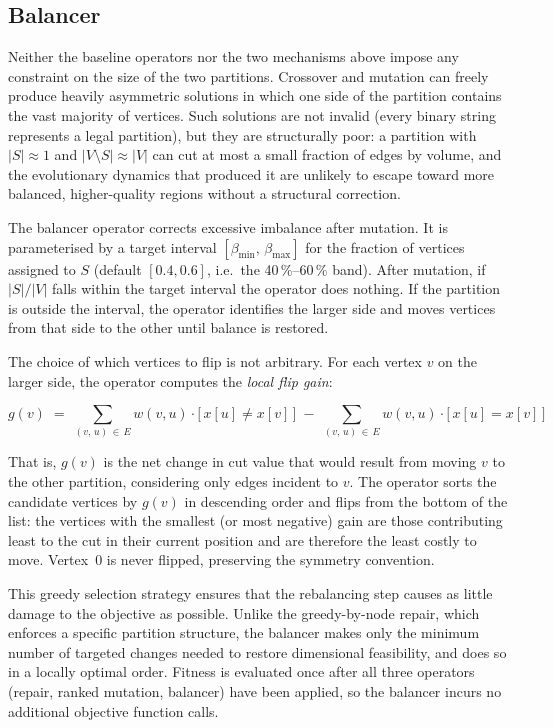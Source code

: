\documentclass[12pt]{article}
\begin{document}
\subsection{Balancer}
\label{sec:balancer}

Neither the baseline operators nor the two mechanisms above impose any constraint on
the size of the two partitions.
Crossover and mutation can freely produce heavily asymmetric solutions in which one
side of the partition contains the vast majority of vertices.
Such solutions are not invalid (every binary string represents a legal partition),
but they are structurally poor: a partition with $|S| \approx 1$ and
$|V \setminus S| \approx |V|$ can cut at most a small fraction of edges by volume,
and the evolutionary dynamics that produced it are unlikely to escape toward more
balanced, higher-quality regions without a structural correction.

The balancer operator corrects excessive imbalance after mutation.
It is parameterised by a target interval $[\beta_{\min},\, \beta_{\max}]$ for the
fraction of vertices assigned to $S$ (default $[0.4, 0.6]$, i.e.\ the
40\,\%--60\,\% band).
After mutation, if $|S| / |V|$ falls within the target interval the operator does
nothing.
If the partition is outside the interval, the operator identifies the larger side and
moves vertices from that side to the other until balance is restored.

The choice of which vertices to flip is not arbitrary.
For each vertex $v$ on the larger side, the operator computes the \emph{local flip
gain}:

\begin{equation}
    g(v) \;=\; \sum_{(v,\,u)\,\in\,E} w(v,u)\cdot\bigl[\,x[u] \neq x[v]\,\bigr]
    \;-\; \sum_{(v,\,u)\,\in\,E} w(v,u)\cdot\bigl[\,x[u] = x[v]\,\bigr]
\end{equation}

That is, $g(v)$ is the net change in cut value that would result from moving $v$
to the other partition, considering only edges incident to $v$.
The operator sorts the candidate vertices by $g(v)$ in descending order and flips
from the bottom of the list: the vertices with the smallest (or most negative) gain
are those contributing least to the cut in their current position and are therefore
the least costly to move.
Vertex~0 is never flipped, preserving the symmetry convention.

This greedy selection strategy ensures that the rebalancing step causes as little
damage to the objective as possible.
Unlike the greedy-by-node repair, which enforces a specific partition structure, the
balancer makes only the minimum number of targeted changes needed to restore
dimensional feasibility, and does so in a locally optimal order.
Fitness is evaluated once after all three operators (repair, ranked mutation,
balancer) have been applied, so the balancer incurs no additional objective function
calls.
\end{document}
